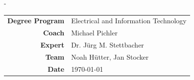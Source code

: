 \begin{titlingpage}
\begin{SingleSpace}
\begin{adjustwidth*}{\unitlength}{-\unitlength}
\begin{center}
\begin{tabular}{>{\bfseries}rl}
        \large Degree Program   & Electrical and Information Technology \\[2mm]
        \large Coach            & Michael Pichler \\[2mm]
        \large Expert           & Dr. J\"urg M. Stettbacher\\[2mm]
        \large Team             & Noah H\"utter, Jan Stocker \\[2mm]
        \large Date             & \today \\[2mm]
\end{tabular}

\vspace{12mm}
\end{center}
\end{adjustwidth*}
\end{SingleSpace}

\tikzexternaldisable
{}
\tikzexternalenable

\end{titlingpage}
